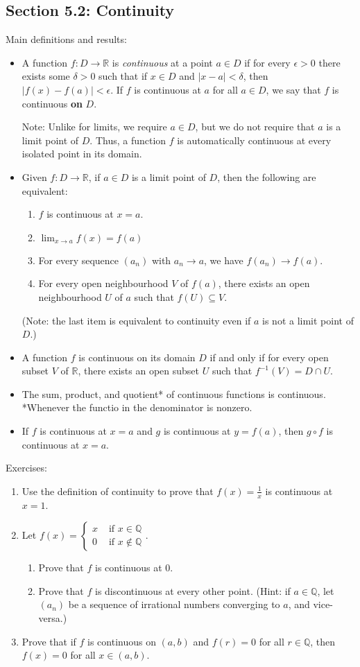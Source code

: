 \documentclass[letterpaper,12pt]{article}
\newcommand{\Q}{\mathbb{Q}}
\newcommand{\R}{\mathbb{R}}
\newcommand{\abs}[1]{\lvert #1\rvert}
\begin{document}
\subsection*{Section 5.2: Continuity}
Main definitions and results:
\begin{itemize}
 \item A function $f:D\to\R$ is {\em continuous} at a point $a\in D$ if for every $\epsilon>0$ there exists some $\delta>0$ such that if $x\in D$ and $\abs{x-a}<\delta$, then $\abs{f(x)-f(a)}<\epsilon$. If $f$ is continuous at $a$ for all $a\in D$, we say that $f$ is continuous {\bf on} $D$.

Note: Unlike for limits, we require $a\in D$, but we do not require that $a$ is a limit point of $D$. Thus, a function $f$ is automatically continuous at every isolated point in its domain.
 \item Given $f:D\to\R$, if $a\in D$ is a limit point of $D$, then the following are equivalent:
\begin{enumerate}
 \item $f$ is continuous at $x=a$.
 \item $\displaystyle \lim_{x\to a}f(x) = f(a)$
 \item For every sequence $(a_n)$ with $a_n\to a$, we have $f(a_n)\to f(a)$.
 \item For every open neighbourhood $V$ of $f(a)$, there exists an open neighbourhood $U$ of $a$ such that $f(U)\subseteq V$.
 \end{enumerate}
(Note: the last item is equivalent to continuity even if $a$ is not a limit point of $D$.)
\item A function $f$ is continuous on its domain $D$ if and only if for every open subset $V$ of $\R$, there exists an open subset $U$ such that $f^{-1}(V) = D\cap U$.
\item The sum, product, and quotient* of continuous functions is continuous. *Whenever the functio in the denominator is nonzero.
\item If $f$ is continuous at $x=a$ and $g$ is continuous at $y=f(a)$, then $g\circ f$ is continuous at $x=a$.
\end{itemize}

\noindent Exercises:

\begin{enumerate}
 \item Use the definition of continuity to prove that $f(x)=\frac{1}{x}$ is continuous at $x=1$.
 \item Let $f(x)=\begin{cases} x & \text{ if } x\in \Q\\ 0 & \text{ if } x\notin \Q\end{cases}.$ 
\begin{enumerate}
 \item Prove that $f$ is continuous at 0.
 \item Prove that $f$ is discontinuous at every other point. (Hint: if $a\in \Q$, let $(a_n)$ be a sequence of irrational numbers converging to $a$, and vice-versa.)
\end{enumerate}
 \item Prove that if $f$ is continuous on $(a,b)$ and $f(r)=0$ for all $r\in\Q$, then $f(x)=0$ for all $x\in (a,b)$.
\end{enumerate}
\end{document}
